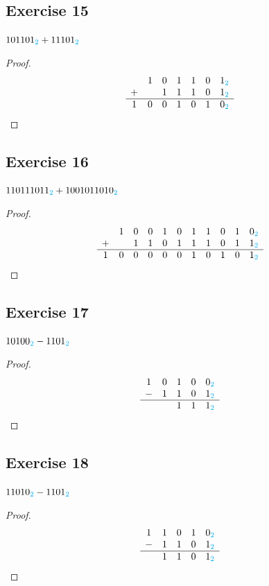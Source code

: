 \documentclass[14pt]{extarticle}
\newcommand{\base}[1]{{\color{cyan}#1}}
\begin{document}
\subsection{Exercise 15} 
$101101_\base{2} + 11101_\base{2}$

\begin{proof} 
$$ 
\begin{array}{ccccccc} 
&1&0&1&1&0&1_\base{2}\\ 
+&&1&1&1&0&1_\base{2}\\ 
\hline 
1&0&0&1&0&1&0_\base{2}\\ 
\end{array} 
$$ 
\end{proof}

\subsection{Exercise 16} 
$110111011_\base{2} + 1001011010_\base{2}$

\begin{proof} 
$$ 
\begin{array}{ccccccccccc} 
&1&0&0&1&0&1&1&0&1&0_\base{2}\\ 
+&&1&1&0&1&1&1&0&1&1_\base{2}\\ 
\hline 
1&0&0&0&0&0&1&0&1&0&1_\base{2}\\
\end{array} 
$$ 
\end{proof}

\subsection{Exercise 17} 
$10100_\base{2} - 1101_\base{2}$

\begin{proof} 
$$ 
\begin{array}{ccccc} 
1&0&1&0&0_\base{2}\\ 
-&1&1&0&1_\base{2}\\
\hline 
& &1&1&1_\base{2}\\ 
\end{array} 
$$ 
\end{proof}

\subsection{Exercise 18} 
$11010_\base{2} - 1101_\base{2}$

\begin{proof} 
$$ 
\begin{array}{ccccc} 
1&1&0&1&0_\base{2}\\ 
-&1&1&0&1_\base{2}\\
\hline 
&1&1&0&1_\base{2}\\ 
\end{array} 
$$ 
\end{proof}
\end{document}

